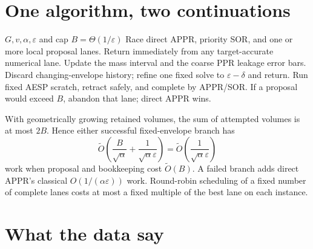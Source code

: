 \section{One algorithm, two continuations}

\begin{algorithm}[t]
\caption{Hard-capped point-source certificate race}
\label{alg:short-race}
\begin{algorithmic}[1]
\REQUIRE $G,v,\alpha,\varepsilon$ and cap $B=\Theta(1/\varepsilon)$
\STATE Race direct APPR, priority SOR, and one or more local proposal lanes.
\STATE Return immediately from any target-accurate numerical lane.
  \STATE Update the mass interval and the coarse PPR leakage error bars.
    \STATE Discard changing-envelope history; refine one fixed solve to
           $\varepsilon-\delta$ and return.
    \STATE Run fixed AESP scratch, retract safely, and complete by APPR/SOR.
  \ENDIF
\ENDFOR
\STATE If a proposal would exceed $B$, abandon that lane; direct APPR wins.
\end{algorithmic}
\end{algorithm}

With geometrically growing retained volumes, the sum of attempted volumes is
at most $2B$.  Hence either successful fixed-envelope branch has
\begin{equation}
 \widetilde O\!\left(\frac{B}{\sqrt\alpha}
              +\frac{1}{\sqrt\alpha\varepsilon}\right)
 =\widetilde O\!\left(\frac{1}{\sqrt\alpha\varepsilon}\right)
 \label{eq:short-success-work}
\end{equation}
work when proposal and bookkeeping cost $\widetilde O(B)$.  A failed branch
adds direct APPR's classical $O(1/(\alpha\varepsilon))$ work.  Round-robin
scheduling of a fixed number of complete lanes costs at most a fixed multiple
of the best lane on each instance.



\section{What the data say}

